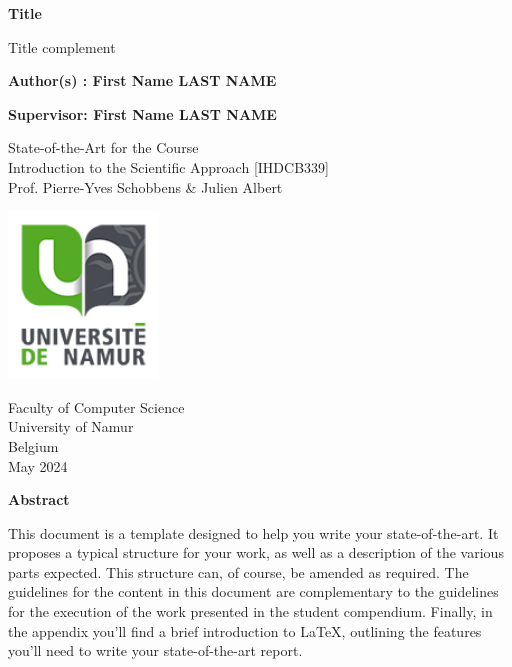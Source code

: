 \documentclass[a4paper]{scrartcl}
\begin{document}
	

\begin{titlepage}
	\begin{center}
		\vspace*{1cm}
		
		{\LARGE \textbf{Title}}
		
		\vspace{0.5cm}
		
		{\LARGE Title complement}
		
		\vspace{1.5cm}
		
		\textbf{Author(s) : First Name LAST NAME}
		
		\vspace{0.5cm}
		
		\textbf{Supervisor: First Name LAST NAME}
		
		\vfill
		
		State-of-the-Art for the Course\\
		Introduction to the Scientific Approach [IHDCB339]\\
        Prof. Pierre-Yves Schobbens \& Julien Albert 	
		
        \vspace{0.8cm}
        
		\includegraphics[width=0.3\textwidth]{figures/unamur}
  
		Faculty of Computer Science\\
		University of Namur\\
		Belgium\\
		May 2024
	\end{center}
\end{titlepage}
\newpage
\begin{center}
	\textbf{Abstract}
\end{center}

This document is a template designed to help you write your state-of-the-art. It proposes a typical structure for your work, as well as a description of the various parts expected. This structure can, of course, be amended as required.
The guidelines for the content in this document are complementary to the guidelines for the execution of the work presented in the student compendium.
Finally, in the appendix you'll find a brief introduction to \LaTeX, outlining the features you'll need to write your state-of-the-art report.
\end{document}
